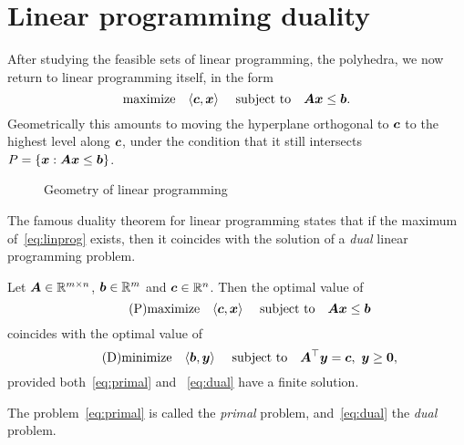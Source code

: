 \section{Linear programming duality}
After studying the feasible sets of linear programming, the polyhedra, we now return to linear programming itself, in the form
\begin{equation}\label{eq:linprog}
 \text{maximize}\quad \langle {\bm{c}}, {\bm{x}} \rangle \ \quad\text{subject to}\quad \bm{A}\bm{x}\leq \bm{b}.
\end{equation}
Geometrically this amounts to moving the hyperplane orthogonal to $\bm{c}$ to the highest level along $\bm{c}$, under the condition that it still intersects $P=\{\bm{x}\mathrel{\mathop{:}} \bm{A}\bm{x}\leq \bm{b}\}$. 
\begin{figure}[h!]
\centering
{}
\caption{Geometry of linear programming} \label{fig:geomlinprog}
\end{figure}

The famous duality theorem for linear programming states that if the maximum of~\eqref{eq:linprog} exists, then it coincides with the solution of a {\em dual} linear programming problem.

\begin{theorem}\label{thm:duality}
Let $\bm{A}\in \mathbb{R}^{m\times n}$, $\bm{b}\in \mathbb{R}^m$ and $\bm{c}\in \mathbb{R}^n$. Then
the optimal value of
\begin{equation}\label{eq:primal}\tag{P}
 \text{maximize}\quad \langle {\bm{c}}, {\bm{x}} \rangle \ \quad\text{subject to}\quad \bm{A}\bm{x}\leq \bm{b}
\end{equation}
coincides with the optimal value of
\begin{equation}\label{eq:dual}\tag{D}
 \text{minimize}\quad \langle {\bm{b}}, {\bm{y}} \rangle \ \quad\text{subject to}\quad \bm{A}^{\top}\bm{y}=\bm{c}, \  \bm{y}\geq \bm{0},
\end{equation}
provided both~\eqref{eq:primal} and ~\eqref{eq:dual} have a finite solution.
\end{theorem}

The problem~\eqref{eq:primal} is called the {\em primal} problem, and~\eqref{eq:dual} the {\em dual} problem.

